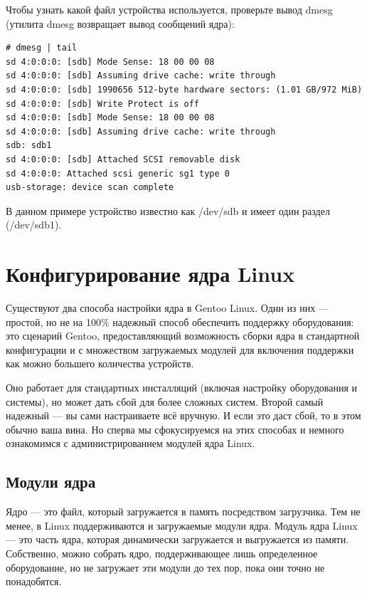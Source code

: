 \documentclass[10pt]{book}
\begin{document}
Чтобы узнать какой файл устройства используется, проверьте вывод dmesg (утилита dmesg возвращает вывод сообщений ядра):

\vspace{3mm}
\begin{tcolorbox}
\begin{lstlisting}
# dmesg | tail
sd 4:0:0:0: [sdb] Mode Sense: 18 00 00 08
sd 4:0:0:0: [sdb] Assuming drive cache: write through
sd 4:0:0:0: [sdb] 1990656 512-byte hardware sectors: (1.01 GB/972 MiB)
sd 4:0:0:0: [sdb] Write Protect is off
sd 4:0:0:0: [sdb] Mode Sense: 18 00 00 08
sd 4:0:0:0: [sdb] Assuming drive cache: write through
sdb: sdb1
sd 4:0:0:0: [sdb] Attached SCSI removable disk
sd 4:0:0:0: Attached scsi generic sg1 type 0
usb-storage: device scan complete
\end{lstlisting}
\end{tcolorbox}

В данном примере устройство известно как /dev/sdb и имеет один раздел (/dev/sdb1).

\section {Конфигурирование ядра Linux}

Существуют два способа настройки ядра в Gentoo Linux. Один из них — простой, но не на 100\% надежный способ обеспечить поддержку оборудования: это сценарий Gentoo, предоставляющий возможность сборки ядра в стандартной конфигурации и с множеством загружаемых модулей для включения поддержки как можно большего количества устройств. 

Оно работает для стандартных инсталляций (включая настройку оборудования и системы), но может дать сбой для более сложных систем. Второй самый надежный — вы сами настраиваете всё вручную. И если это даст сбой, то в этом обычно ваша вина. 
Но сперва мы сфокусируемся на этих способах и немного ознакомимся с администрированием модулей ядра Linux.

\subsection{Модули ядра}

Ядро — это файл, который загружается в память посредством загрузчика. Тем не менее, в Linux поддерживаются и загружаемые модули ядра.
Модуль ядра Linux — это часть ядра, которая динамически загружается и выгружается из памяти. Собственно, можно собрать ядро, поддерживающее лишь определенное оборудование, но не загружает эти модули до тех пор, пока они точно не понадобятся.
\end{document}
